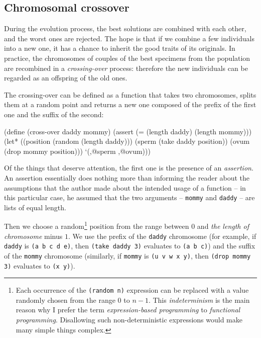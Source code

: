 \subsection{Chromosomal crossover}

During the evolution process, the best solutions are
combined with each other, and the worst ones are rejected.
The hope is that if we combine a few individuals into
a new one, it has a chance to inherit the good traits
of its originals. In practice, the chromosomes
of couples of the best specimens from the population
are recombined in a \textit{crossing-over} process:
therefore the new individuals can be regarded as
an offspring of the old ones.

The crossing-over can be defined as a function that takes
two chromosomes, splits them at a random point and returns
a new one composed of the prefix of the first one and
the suffix of the second:

\begin{Snippet}
(define (cross-over daddy mommy)
  (assert (= (length daddy) (length mommy)))
  (let* ((position (random (length daddy)))
	 (sperm (take daddy position))
	 (ovum (drop mommy position)))
    `(,@sperm ,@ovum)))
\end{Snippet}

Of the things that deserve attention, the first one is the
presence of an \textit{assertion}. An assertion essentially
does nothing more than informing the reader about the
assumptions that the author made about the intended usage
of a function -- in this particular case, he assumed that
the two arguments -- \texttt{mommy} and \texttt{daddy}
-- are lists of equal length.

Then we choose a random\footnote{Each occurrence of the
\texttt{(random n)} expression can be replaced with
a value randomly chosen from the range $0$ to $n-1$.
This \textit{indeterminism} is the main reason why
I prefer the term \textit{expression-based programming}
to \textit{functional programming}. Disallowing such
non-deterministic expressions would make many simple
things complex.} position from the range between
$0$ and \textit{the length of chromosome} minus $1$.
We use the prefix of the \texttt{daddy} chromosome (for
example, if \texttt{daddy} is \texttt{(a\,b\,c\,d\,e)}, then
\texttt{(take daddy 3)} evaluates to \texttt{(a\,b\,c)})
and the suffix of the \texttt{mommy} chromosome (similarly,
if \texttt{mommy} is \texttt{(u\,v\,w\,x\,y)}, then
\texttt{(drop mommy 3)} evaluates to \texttt{(x\,y)}).

